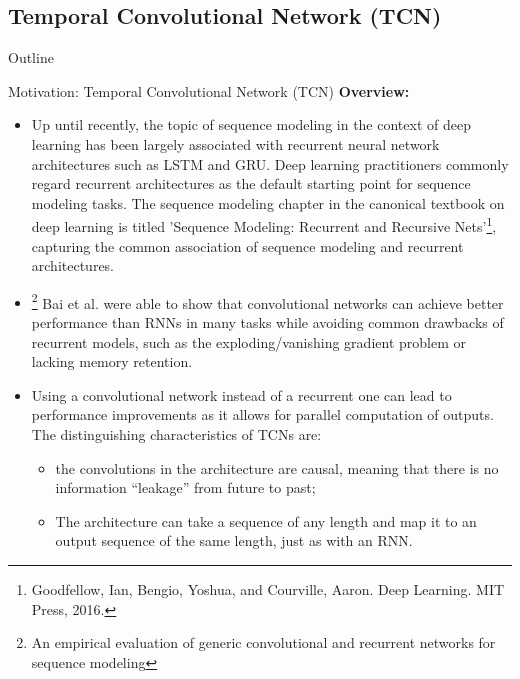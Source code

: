 \documentclass[8pt,xcolor=dvipsnames,compress]{beamer}
\begin{document}
\subsection{Temporal Convolutional Network (TCN)} 
\begin{frame}{Outline}
\end{frame}
\begin{frame}{Motivation: Temporal Convolutional Network (TCN)}
\footnotesize
\textbf{Overview:}
\begin{itemize}
    \item Up until recently, the topic of sequence modeling in the context of deep learning has been largely associated with recurrent neural network architectures such as LSTM and GRU. Deep learning practitioners commonly regard recurrent architectures as the default starting point for sequence modeling tasks. The sequence modeling chapter in the canonical textbook on deep learning is titled 'Sequence Modeling: Recurrent and Recursive Nets'\footnote{Goodfellow, Ian, Bengio, Yoshua, and Courville, Aaron. Deep Learning. MIT Press, 2016.}, capturing the common association of sequence modeling and recurrent architectures.
    \item \footnote{An empirical evaluation of generic convolutional and recurrent networks for sequence modeling} Bai et al. were able to show that convolutional networks can achieve better performance than RNNs in many tasks while avoiding common drawbacks of recurrent models, such as the exploding/vanishing gradient problem or lacking memory retention.
    \item  Using a convolutional network instead of a recurrent one can lead to performance improvements as it allows for parallel computation of outputs. 
    The distinguishing characteristics of TCNs are: 
    \begin{itemize}
    \item[1]  the convolutions in the architecture are causal, meaning that there is no information “leakage” from future to past;
    \item[2] The architecture can take a sequence of any length and map it to an output sequence of the same length, just as with an RNN.
    \end{itemize}
    
\end{itemize}

\end{frame}
\end{document}
